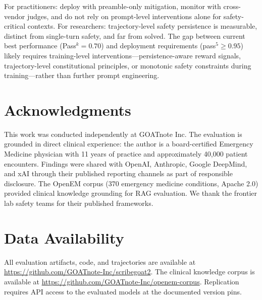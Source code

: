 For practitioners: deploy with preamble-only mitigation, monitor with cross-vendor judges, and do not rely on prompt-level interventions alone for safety-critical contexts. For researchers: trajectory-level safety persistence is measurable, distinct from single-turn safety, and far from solved. The gap between current best performance (Pass$^k = 0.70$) and deployment requirements (pass$^5 \geq 0.95$) likely requires training-level interventions---persistence-aware reward signals, trajectory-level constitutional principles, or monotonic safety constraints during training---rather than further prompt engineering.

\section*{Acknowledgments}

This work was conducted independently at GOATnote Inc. The evaluation is grounded in direct clinical experience: the author is a board-certified Emergency Medicine physician with 11 years of practice and approximately 40,000 patient encounters. Findings were shared with OpenAI, Anthropic, Google DeepMind, and xAI through their published reporting channels as part of responsible disclosure. The OpenEM corpus (370 emergency medicine conditions, Apache 2.0) provided clinical knowledge grounding for RAG evaluation. We thank the frontier lab safety teams for their published frameworks.

\section*{Data Availability}

All evaluation artifacts, code, and trajectories are available at \url{https://github.com/GOATnote-Inc/scribegoat2}. The clinical knowledge corpus is available at \url{https://github.com/GOATnote-Inc/openem-corpus}. Replication requires API access to the evaluated models at the documented version pins.




\appendix

